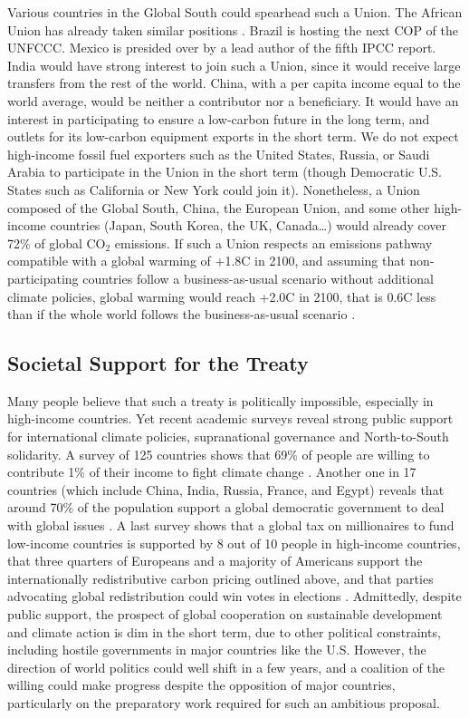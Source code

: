 \documentclass[12pt,english]{article}
\begin{document}
\begin{bibunit}
Various countries in the Global South could spearhead such a Union. The African Union has already taken similar positions \citep{african_union_african_2023}. Brazil is hosting the next COP of the UNFCCC. Mexico is presided over by a lead author of the fifth IPCC report. India would have strong interest to join such a Union, since it would receive large transfers from the rest of the world. China, with a per capita income equal to the world average, would be neither a contributor nor a beneficiary. It would have an interest in participating to ensure a low-carbon future in the long term, and outlets for its low-carbon equipment exports in the short term. We do not expect high-income fossil fuel exporters such as the United States, Russia, or Saudi Arabia to participate in the Union in the short term (though Democratic U.S. States such as California or New York could join it). Nonetheless, a Union composed of the Global South, China, the European Union, and some other high-income countries (Japan, South Korea, the UK, Canada…) would already cover 72\% of global CO$_\text{2}$ emissions. If such a Union respects an emissions pathway compatible with a global warming of +1.8\textdegree{}C in 2100, and assuming that non-participating countries follow a business-as-usual scenario without additional climate policies, global warming would reach +2.0\textdegree{}C in 2100, that is 0.6\textdegree{}C less than if the whole world follows the business-as-usual scenario \citep{fabre_global_2025}.

\subsection*{Societal Support for the Treaty}
Many people believe that such a treaty is politically impossible, especially in high-income countries. Yet recent academic surveys reveal strong public support for international climate policies, supranational governance and North-to-South solidarity. A survey of 125 countries shows that 69\% of people are willing to contribute 1\% of their income to fight climate change \citep{andre_globally_2024}. Another one in 17 countries (which include China, India, Russia, France, and Egypt) reveals that around 70\% of the population support a global democratic government to deal with global issues \citep{ghassim_who_2024}. A last survey shows that a global tax on millionaires to fund low-income countries is supported by 8 out of 10 people in high-income countries, that three quarters of Europeans and a majority of Americans support the internationally redistributive carbon pricing outlined above, and that parties advocating global redistribution could win votes in elections \citep{fabre_majority_2025}. Admittedly, despite public support, the prospect of global cooperation on sustainable development and climate action is dim in the short term, due to other political constraints, including hostile governments in major countries like the U.S. However, the direction of world politics could well shift in a few years, and a coalition of the willing could make progress despite the opposition of major countries, particularly on the preparatory work required for such an ambitious proposal. 


\end{bibunit}
\end{document}
